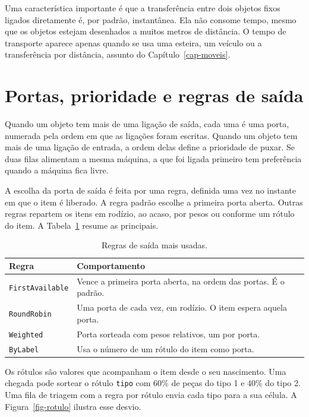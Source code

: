 Uma característica importante é que a transferência entre dois objetos fixos ligados diretamente é, por padrão, instantânea. Ela não consome tempo, mesmo que os objetos estejam desenhados a muitos metros de distância. O tempo de transporte aparece apenas quando se usa uma esteira, um veículo ou a transferência por distância, assunto do Capítulo~\ref{cap-moveis}.

\section{Portas, prioridade e regras de saída}

Quando um objeto tem mais de uma ligação de saída, cada uma é uma porta, numerada pela ordem em que as ligações foram escritas. Quando um objeto tem mais de uma ligação de entrada, a ordem delas define a prioridade de puxar. Se duas filas alimentam a mesma máquina, a que foi ligada primeiro tem preferência quando a máquina fica livre.

A escolha da porta de saída é feita por uma regra, definida uma vez no instante em que o item é liberado. A regra padrão escolhe a primeira porta aberta. Outras regras repartem os itens em rodízio, ao acaso, por pesos ou conforme um rótulo do item. A Tabela~\ref{tab-regras} resume as principais.

\begin{table}[ht]
\centering
\caption{Regras de saída mais usadas.}
\label{tab-regras}
\begin{tabular}{@{}p{3.6cm}p{9.6cm}@{}}
\toprule
\textbf{Regra} & \textbf{Comportamento} \\
\midrule
\texttt{FirstAvailable} & Vence a primeira porta aberta, na ordem das portas. É o padrão. \\
\texttt{RoundRobin} & Uma porta de cada vez, em rodízio. O item espera aquela porta. \\
\texttt{Weighted} & Porta sorteada com pesos relativos, um por porta. \\
\texttt{ByLabel} & Usa o número de um rótulo do item como porta. \\
\bottomrule
\end{tabular}
\end{table}

Os rótulos são valores que acompanham o item desde o seu nascimento. Uma chegada pode sortear o rótulo \texttt{tipo} com 60\% de peças do tipo 1 e 40\% do tipo 2. Uma fila de triagem com a regra por rótulo envia cada tipo para a sua célula. A Figura~\ref{fig-rotulo} ilustra esse desvio.

